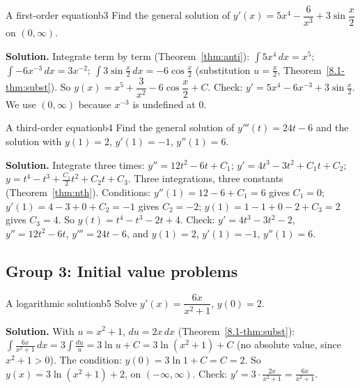 \documentclass[11pt]{article}
\begin{document}
\begin{exmp}{A first-order equation}{b3}
Find the general solution of $y'(x)=5x^4-\dfrac{6}{x^3}+3\sin\dfrac x2$ on $(0,\infty)$.

\textbf{Solution.} Integrate term by term (Theorem~\ref{thm:anti}): $\int5x^4\,dx=x^5$; $\int-6x^{-3}\,dx=3x^{-2}$; $\int3\sin\frac x2\,dx=-6\cos\frac x2$ (substitution $u=\frac x2$, Theorem~\ref{8.1-thm:subst}). So $y(x)=x^5+\dfrac3{x^2}-6\cos\dfrac x2+C$. Check: $y'=5x^4-6x^{-3}+3\sin\frac x2$. We use $(0,\infty)$ because $x^{-3}$ is undefined at $0$.
\end{exmp}

\begin{exmp}{A third-order equation}{b4}
Find the general solution of $y'''(t)=24t-6$ and the solution with $y(1)=2$, $y'(1)=-1$, $y''(1)=6$.

\textbf{Solution.} Integrate three times: $y''=12t^2-6t+C_1$; $y'=4t^3-3t^2+C_1t+C_2$; $y=t^4-t^3+\frac{C_1}2t^2+C_2t+C_3$. Three integrations, three constants (Theorem~\ref{thm:nth}). Conditions: $y''(1)=12-6+C_1=6$ gives $C_1=0$; $y'(1)=4-3+0+C_2=-1$ gives $C_2=-2$; $y(1)=1-1+0-2+C_3=2$ gives $C_3=4$. So $y(t)=t^4-t^3-2t+4$. Check: $y'=4t^3-3t^2-2$, $y''=12t^2-6t$, $y'''=24t-6$, and $y(1)=2$, $y'(1)=-1$, $y''(1)=6$.
\end{exmp}

\subsection*{Group 3: Initial value problems}

\begin{exmp}{A logarithmic solution}{b5}
Solve $y'(x)=\dfrac{6x}{x^2+1}$, $y(0)=2$.

\textbf{Solution.} With $u=x^2+1$, $du=2x\,dx$ (Theorem~\ref{8.1-thm:subst}): $\int\frac{6x}{x^2+1}\,dx=3\int\frac{du}u=3\ln u+C=3\ln(x^2+1)+C$ (no absolute value, since $x^2+1>0$). The condition: $y(0)=3\ln1+C=C=2$. So $y(x)=3\ln(x^2+1)+2$, on $(-\infty,\infty)$. Check: $y'=3\cdot\frac{2x}{x^2+1}=\frac{6x}{x^2+1}$.
\end{exmp}
\end{document}
